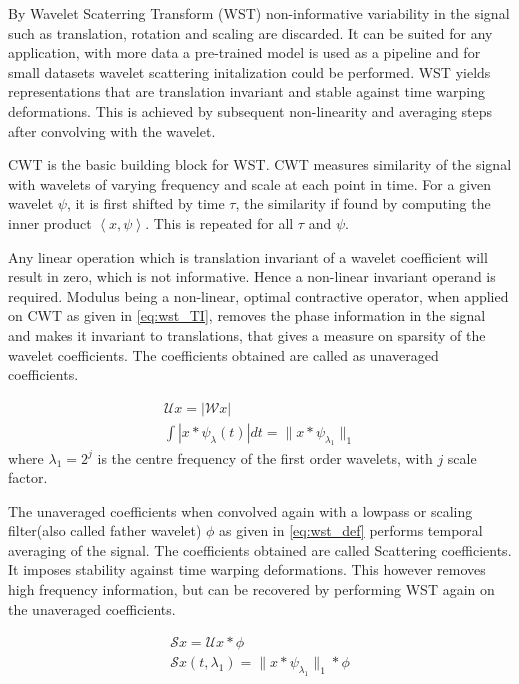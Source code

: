 By Wavelet Scaterring Transform (WST) non-informative variability in the signal such as translation, rotation and scaling are discarded. It can be suited for any application, with more data a pre-trained model is used as a pipeline and for small datasets wavelet scattering initalization could be performed. WST yields representations that are translation invariant and stable against time warping deformations. This is achieved by subsequent non-linearity and averaging steps after convolving with the wavelet. 

CWT is the basic building block for WST. CWT measures similarity of the signal with wavelets of varying frequency and scale at each point in time. For a given wavelet $\psi$, it is first shifted by time $\tau$, the similarity if found by computing the inner product $\left\langle x, \psi \right\rangle$. This is repeated for all $\tau$ and $\psi$.

Any linear operation which is translation invariant of a wavelet coefficient will result in zero, which is not informative. Hence a non-linear invariant operand is required. Modulus being a non-linear, optimal contractive operator, when applied on CWT as given in \ref{eq:wst_TI}, removes the phase information in the signal and makes it invariant to translations,  that gives a measure on sparsity of the wavelet coefficients. The coefficients obtained are called as unaveraged coefficients. 

\begin{equation} \label{eq:wst_TI}
    \begin{split}
     \mathcal{U} x = |\mathcal{W} x|\\
     \int | x \ast \psi_\lambda(t) | dt = \| x \ast \psi_{\lambda_{1}}\|_1 
    \end{split}
\end{equation}
where $\lambda_1 = 2^j$ is the centre frequency of the first order wavelets, with $j$ scale factor.

The unaveraged coefficients when convolved again with a lowpass or scaling filter(also called father wavelet) $\phi$ as given in \ref{eq:wst_def} performs temporal averaging of the signal. The coefficients obtained are called Scattering coefficients. It imposes stability against time warping deformations. This however removes high frequency information, but can be recovered by performing WST again on the unaveraged coefficients.

\begin{equation} \label{eq:wst_def}
    \begin{split}
        \mathcal{S} x = \mathcal{U} x \ast \phi\\
        \mathcal{S} x(t, \lambda_1) = \| x \ast \psi_{\lambda_{1}}\|_1 \ast \phi         
    \end{split}
\end{equation}


